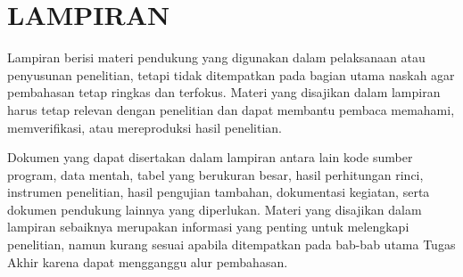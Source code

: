\chapter*{\MakeUppercase{Lampiran}}

Lampiran berisi materi pendukung yang digunakan dalam pelaksanaan atau penyusunan penelitian, tetapi tidak ditempatkan pada bagian utama naskah agar pembahasan tetap ringkas dan terfokus. Materi yang disajikan dalam lampiran harus tetap relevan dengan penelitian dan dapat membantu pembaca memahami, memverifikasi, atau mereproduksi hasil penelitian.

Dokumen yang dapat disertakan dalam lampiran antara lain kode sumber program, data mentah, tabel yang berukuran besar, hasil perhitungan rinci, instrumen penelitian, hasil pengujian tambahan, dokumentasi kegiatan, serta dokumen pendukung lainnya yang diperlukan. Materi yang disajikan dalam lampiran sebaiknya merupakan informasi yang penting untuk melengkapi penelitian, namun kurang sesuai apabila ditempatkan pada bab-bab utama Tugas Akhir karena dapat mengganggu alur pembahasan.
